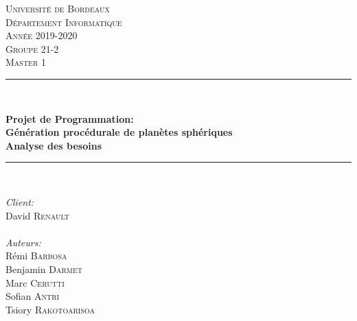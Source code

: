 \documentclass[a4paper]{article}
\begin{document}
\newcommand{\customlarge}[1]{\noindent \Large{\textbf{#1}}}
\newcommand{\customitalic}[1]{\large{\textbf{\textit{#1}}}}
\newcommand{\avis}[2]{\customlarge{Avis personnel -} \customitalic{#1} \\ #2\\[0.8cm]}
\newcommand*{\escape}[1]{\texttt{\textbackslash#1}}

\newcommand{\customquote}[1]{\guillemotleft {#1} \guillemorright~}

\renewcommand{\contentsname}{Sommaire}

\begin{titlepage}
\newcommand{\HRule}{\rule{\linewidth}{0.5mm}} %

\center %
 

\textsc{\LARGE Université de Bordeaux}\\[0.5cm]
\textsc{\large Département Informatique}\\[0.5cm]
\textsc{\large Année 2019-2020}\\[1.5cm]
\textsc{\Large Groupe 21-2}\\[0.2cm] 
\textsc{\large Master 1}\\[0.3cm] 


\HRule \\[0.4cm]
{  \huge \bfseries Projet de Programmation: \\
   \huge \bfseries Génération procédurale de planètes sphériques\\[0.4cm] 
   \Large \bfseries Analyse des besoins
\HRule \\[1.5cm]
 

\begin{minipage}{0.4\textwidth}
\begin{center} \large
\emph{Client:}\\
David \textsc{Renault}\\
~\\
\emph{Auteurs:}\\
Rémi \textsc{Barbosa}\\
Benjamin \textsc{Darmet}\\
Marc \textsc{Cerutti}\\
Sofian \textsc{Antri}\\
Tsiory \textsc{Rakotoarisoa}\\
\end{center}
\end{minipage}
~
}


\end{titlepage}
\end{document}
